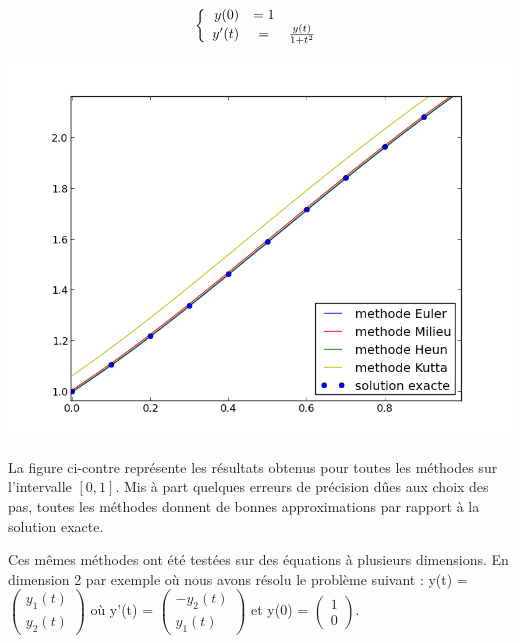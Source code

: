 \[
   \left \{
   \begin{array}{r c l}
      y(0)  & = 1 \\
      y'(t) & = & \frac{y(t)}{1+t^2}
   \end{array}
   \right .
\]
\begin{minipage}{0.4\textwidth}
\includegraphics[scale = 0.4]{all.png}
\label{elipse}
\end{minipage} \hfill
\begin{minipage}{0.45\textwidth}
La figure ci-contre représente les résultats obtenus pour toutes les méthodes sur l'intervalle $[0,1]$. Mis à part quelques erreurs de précision dûes aux choix des pas, toutes les méthodes donnent de bonnes approximations par rapport à la solution exacte.

\end{minipage}



Ces mêmes méthodes ont été testées sur des équations à plusieurs dimensions. 
En dimension 2 par exemple où nous avons résolu le problème suivant : 
y(t) =
$\begin{pmatrix}
   y_1(t) \\
   y_2 (t) 
\end{pmatrix} $  où y'(t) = 
$\begin{pmatrix}
   -y_2(t) \\
   y_1 (t) 
\end{pmatrix}$ et y(0) =
$\begin{pmatrix}
   1 \\
   0 
\end{pmatrix} $.


